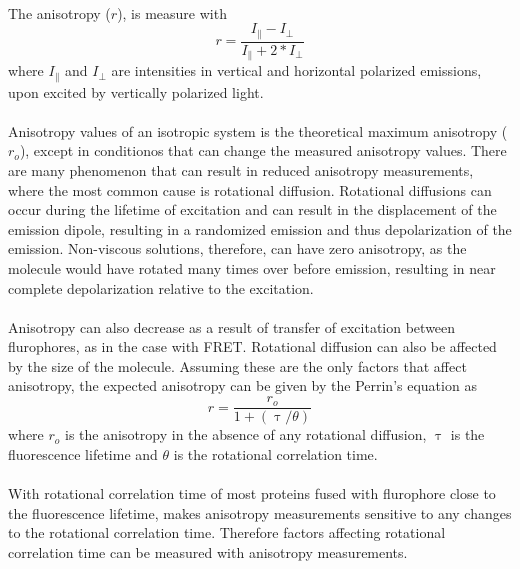 \paragraph*{} The anisotropy ($r$), is measure with \[ r = \frac{I_\parallel - I_\perp}{I_\parallel + 2* I_\perp} \] where $I_\parallel$ and $I_\perp$ are intensities in vertical and horizontal polarized emissions, upon excited by vertically polarized light.

\paragraph*{} Anisotropy values of an isotropic system is the theoretical maximum anisotropy ($r_o$), except in conditionos that can change the measured anisotropy values. There are many phenomenon that can result in reduced anisotropy measurements, where the most common cause is rotational diffusion. Rotational diffusions can occur during the lifetime of excitation and can result in the displacement of the emission dipole, resulting in a randomized emission and thus depolarization of the emission. Non-viscous solutions, therefore, can have zero anisotropy, as the molecule would have rotated many times over before emission, resulting in near complete depolarization relative to the excitation.

\paragraph*{} Anisotropy can also decrease as a result of transfer of excitation between flurophores, as in the case with FRET. Rotational diffusion can also be affected by the size of the molecule. Assuming these are the only factors that affect anisotropy, the expected anisotropy can be given by the Perrin's equation as \[ r = \frac{r_o}{1 + (\uptau/\theta)} \] where $r_o$ is the anisotropy in the absence of any rotational diffusion, $\uptau$ is the fluorescence lifetime and $\theta$ is the rotational correlation time.

\paragraph*{} With rotational correlation time of most proteins fused with flurophore close to the fluorescence lifetime, makes anisotropy measurements sensitive to any changes to the rotational correlation time. Therefore factors affecting rotational correlation time can be measured with anisotropy measurements.


